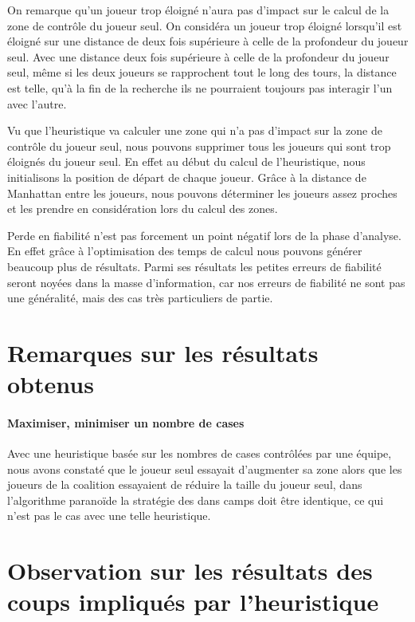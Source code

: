 On remarque qu'un joueur trop éloigné n'aura pas d'impact sur le 
calcul de la zone de contrôle du joueur seul. On considéra un joueur trop
éloigné lorsqu'il est éloigné sur une distance de deux fois supérieure à 
celle de la profondeur du joueur seul. Avec une distance deux fois supérieure
à celle de la profondeur du joueur seul, même si les deux joueurs se
rapprochent tout le long des tours, la distance est telle, qu'à la fin de la
recherche ils ne pourraient toujours pas interagir l'un avec l'autre.

Vu que l'heuristique va calculer une zone qui n'a pas d'impact sur la
zone de contrôle du joueur seul, nous pouvons supprimer tous les joueurs qui
sont trop éloignés du joueur seul. En effet au début du calcul de
l'heuristique, nous initialisons la position de départ de chaque joueur.
Grâce à la distance de Manhattan entre les joueurs, nous pouvons déterminer
les joueurs assez proches et les prendre en considération lors du calcul des
zones.

\begin{info}
	Perde en fiabilité n'est pas forcement un point négatif lors de
	la phase d'analyse. En effet grâce à l'optimisation des temps de calcul nous
	pouvons générer beaucoup plus de résultats. Parmi ses résultats les petites
	erreurs de fiabilité seront noyées dans la masse d'information, car nos
	erreurs de fiabilité ne sont pas une généralité, mais des cas très
	particuliers de partie.
\end{info}


\section{Remarques sur les résultats obtenus}

\paragraph{Maximiser, minimiser un nombre de cases}

Avec une heuristique basée sur les nombres de cases contrôlées par une
équipe, nous avons constaté que le joueur seul essayait d'augmenter sa zone
alors que les joueurs de la coalition essayaient de réduire la taille du 
joueur seul, dans l'algorithme paranoïde la stratégie des dans camps doit
être identique, ce qui n'est pas le cas avec une telle heuristique.

\section{Observation sur les résultats des coups impliqués par l'heuristique}

